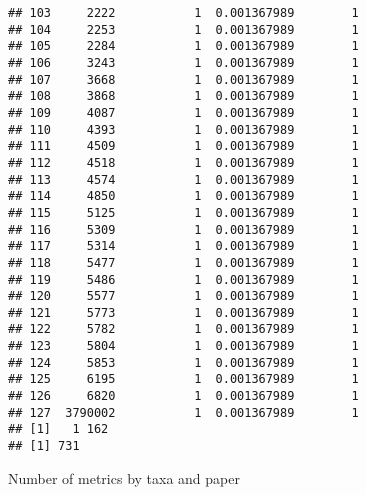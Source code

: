 \documentclass[
]{article}
\newenvironment{Shaded}{\begin{snugshade}}{\end{snugshade}}
\newcommand{\CommentTok}[1]{\textcolor[rgb]{0.56,0.35,0.01}{\textit{#1}}}
\newcommand{\DataTypeTok}[1]{\textcolor[rgb]{0.13,0.29,0.53}{#1}}
\newcommand{\KeywordTok}[1]{\textcolor[rgb]{0.13,0.29,0.53}{\textbf{#1}}}
\newcommand{\NormalTok}[1]{#1}
\newcommand{\OperatorTok}[1]{\textcolor[rgb]{0.81,0.36,0.00}{\textbf{#1}}}
\newcommand{\StringTok}[1]{\textcolor[rgb]{0.31,0.60,0.02}{#1}}
\begin{document}
\begin{verbatim}
## 103     2222           1  0.001367989        1
## 104     2253           1  0.001367989        1
## 105     2284           1  0.001367989        1
## 106     3243           1  0.001367989        1
## 107     3668           1  0.001367989        1
## 108     3868           1  0.001367989        1
## 109     4087           1  0.001367989        1
## 110     4393           1  0.001367989        1
## 111     4509           1  0.001367989        1
## 112     4518           1  0.001367989        1
## 113     4574           1  0.001367989        1
## 114     4850           1  0.001367989        1
## 115     5125           1  0.001367989        1
## 116     5309           1  0.001367989        1
## 117     5314           1  0.001367989        1
## 118     5477           1  0.001367989        1
## 119     5486           1  0.001367989        1
## 120     5577           1  0.001367989        1
## 121     5773           1  0.001367989        1
## 122     5782           1  0.001367989        1
## 123     5804           1  0.001367989        1
## 124     5853           1  0.001367989        1
## 125     6195           1  0.001367989        1
## 126     6820           1  0.001367989        1
## 127  3790002           1  0.001367989        1
## [1]   1 162
## [1] 731
\end{verbatim}

Number of metrics by taxa and paper

\begin{Shaded}
\end{Shaded}
\end{document}
